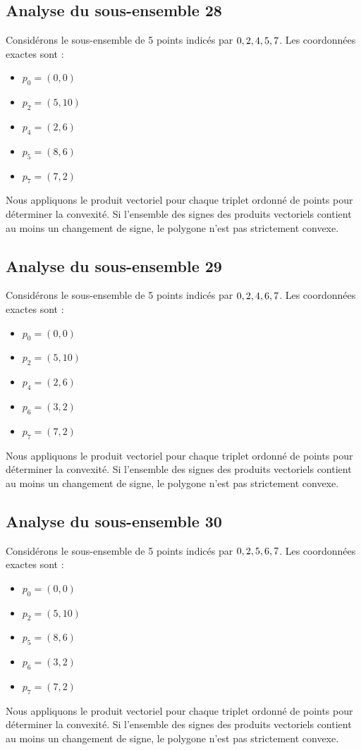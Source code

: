 \documentclass[11pt]{article}
\begin{document}
\subsection{Analyse du sous-ensemble 28}
Considérons le sous-ensemble de 5 points indicés par $\\{ 0, 2, 4, 5, 7 \\}$.
Les coordonnées exactes sont :
\begin{itemize}
\item $p_0 = (0, 0)$
\item $p_2 = (5, 10)$
\item $p_4 = (2, 6)$
\item $p_5 = (8, 6)$
\item $p_7 = (7, 2)$
\end{itemize}
Nous appliquons le produit vectoriel pour chaque triplet ordonné de points pour déterminer la convexité. Si l'ensemble des signes des produits vectoriels contient au moins un changement de signe, le polygone n'est pas strictement convexe.
\newpage

\subsection{Analyse du sous-ensemble 29}
Considérons le sous-ensemble de 5 points indicés par $\\{ 0, 2, 4, 6, 7 \\}$.
Les coordonnées exactes sont :
\begin{itemize}
\item $p_0 = (0, 0)$
\item $p_2 = (5, 10)$
\item $p_4 = (2, 6)$
\item $p_6 = (3, 2)$
\item $p_7 = (7, 2)$
\end{itemize}
Nous appliquons le produit vectoriel pour chaque triplet ordonné de points pour déterminer la convexité. Si l'ensemble des signes des produits vectoriels contient au moins un changement de signe, le polygone n'est pas strictement convexe.
\newpage

\subsection{Analyse du sous-ensemble 30}
Considérons le sous-ensemble de 5 points indicés par $\\{ 0, 2, 5, 6, 7 \\}$.
Les coordonnées exactes sont :
\begin{itemize}
\item $p_0 = (0, 0)$
\item $p_2 = (5, 10)$
\item $p_5 = (8, 6)$
\item $p_6 = (3, 2)$
\item $p_7 = (7, 2)$
\end{itemize}
Nous appliquons le produit vectoriel pour chaque triplet ordonné de points pour déterminer la convexité. Si l'ensemble des signes des produits vectoriels contient au moins un changement de signe, le polygone n'est pas strictement convexe.
\newpage
\end{document}
